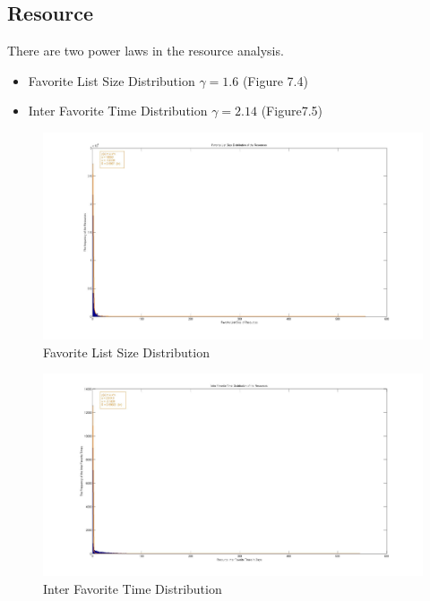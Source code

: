 \documentclass[12pt,a4paper]{report}
\begin{document}
	\clearpage

	\subsection{Resource}

	There are two power laws in the resource analysis.

	\begin{itemize}
	\item Favorite List Size Distribution $\gamma = 1.6$ (Figure 7.4)
	\item Inter Favorite Time Distribution $\gamma = 2.14$ (Figure7.5)
	\end{itemize}

	\vspace{5cm}
	\begin{figure}
	\hspace{-3.7cm}\includegraphics[width=200mm]{resFavDist.jpg}
	\caption{Favorite List Size Distribution}
	\end{figure}

	\vspace{5cm}
	\begin{figure}
	\hspace{-3.7cm}\includegraphics[width=200mm]{resInterDist.jpg}
	\caption{Inter Favorite Time Distribution}	
	\end{figure}
\end{document}
